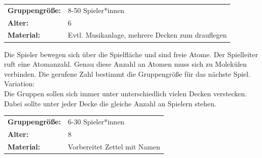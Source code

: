 


\newpage


\begin{table}[h]
\begin{tabular}{>{\bfseries}lp{8cm}}
   Gruppengröße:   & 8-50 Spieler*innen\\
    Alter: & 6 \\
    Material: & Evtl. Musikanlage, mehrere Decken zum drauflegen \\
    \end{tabular}
\end{table} 
Die Spieler bewegen sich über die Spielfläche und sind freie Atome. Der Spielleiter ruft eine Atomanzahl. Genau diese Anzahl an Atomen muss sich zu Molekülen verbinden. Die gerufene Zahl bestimmt die Gruppengröße für das nächste Spiel.
    \\
    Variation: \\
         Die Gruppen sollen sich immer unter unterschiedlich vielen Decken verstecken. Dabei sollte unter jeder Decke die gleiche Anzahl an Spielern stehen. \\






   
\begin{table}[h]
\begin{tabular}{>{\bfseries}lp{8cm}}
   Gruppengröße:   & 6-30 Spieler*innen\\
    Alter: & 8\\
    Material: & Vorbereitet Zettel mit Namen\\
\end{tabular}
\end{table} 

